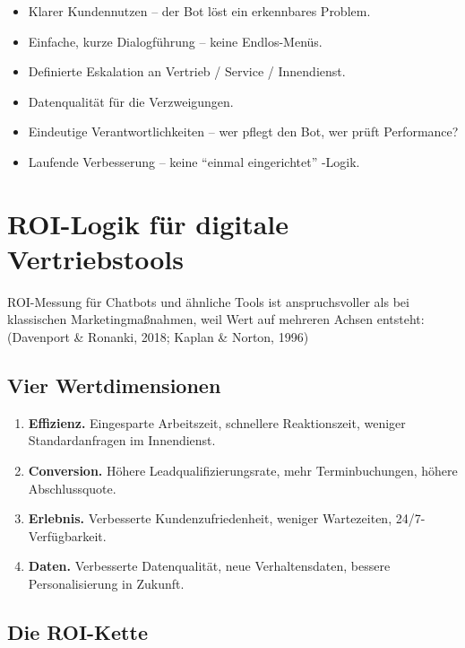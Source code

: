 \documentclass[11pt,a4paper,oneside]{article}
\newcommand{\fachbegriff}[1]{\textbf{#1}}
\newcommand{\quelle}[1]{{\footnotesize\color{lpGray}(#1)}}
\begin{document}
\begin{itemize}
  \item Klarer Kundennutzen -- der Bot löst ein erkennbares Problem.
  \item Einfache, kurze Dialogführung -- keine Endlos-Menüs.
  \item Definierte Eskalation an Vertrieb / Service / Innendienst.
  \item Datenqualität für die Verzweigungen.
  \item Eindeutige Verantwortlichkeiten -- wer pflegt den Bot, wer prüft Performance?
  \item Laufende Verbesserung -- keine ``einmal eingerichtet'' -Logik.
\end{itemize}

\section{ROI-Logik für digitale Vertriebstools}

ROI-Messung für Chatbots und ähnliche Tools ist anspruchsvoller als bei klassischen Marketingmaßnahmen, weil Wert auf mehreren Achsen entsteht: \quelle{Davenport \& Ronanki, 2018; Kaplan \& Norton, 1996}

\subsection{Vier Wertdimensionen}

\begin{enumerate}
  \item \fachbegriff{Effizienz.} Eingesparte Arbeitszeit, schnellere Reaktionszeit, weniger Standardanfragen im Innendienst.
  \item \fachbegriff{Conversion.} Höhere Leadqualifizierungsrate, mehr Terminbuchungen, höhere Abschlussquote.
  \item \fachbegriff{Erlebnis.} Verbesserte Kundenzufriedenheit, weniger Wartezeiten, 24/7-Verfügbarkeit.
  \item \fachbegriff{Daten.} Verbesserte Datenqualität, neue Verhaltensdaten, bessere Personalisierung in Zukunft.
\end{enumerate}

\subsection{Die ROI-Kette}
\end{document}
